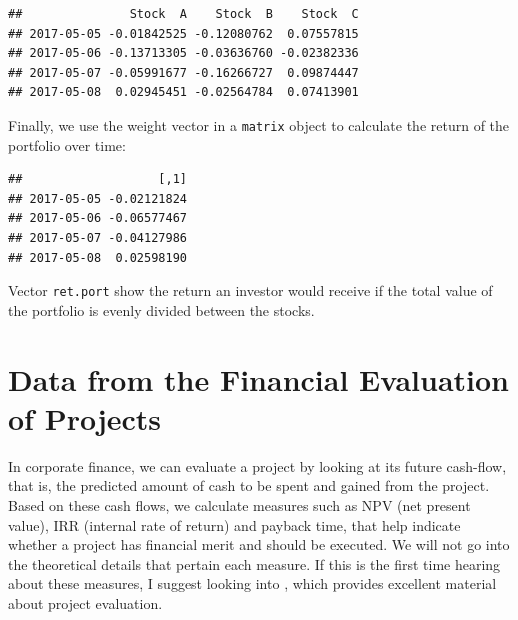 \documentclass[11pt,]{book}
\newenvironment{Shaded}{\begin{snugshade}}{\end{snugshade}}
\newcommand{\KeywordTok}[1]{\textcolor[rgb]{0.27,0.27,0.27}{\textbf{#1}}}
\newcommand{\DataTypeTok}[1]{\textcolor[rgb]{0.27,0.27,0.27}{#1}}
\newcommand{\DecValTok}[1]{\textcolor[rgb]{0.06,0.06,0.06}{#1}}
\newcommand{\StringTok}[1]{\textcolor[rgb]{0.5,0.5,0.5}{#1}}
\newcommand{\CommentTok}[1]{\textcolor[rgb]{0.56,0.35,0.01}{\textit{#1}}}
\newcommand{\OperatorTok}[1]{\textcolor[rgb]{0.81,0.36,0.00}{\textbf{#1}}}
\newcommand{\NormalTok}[1]{#1}
\begin{document}
\begin{verbatim}
##               Stock  A    Stock  B    Stock  C
## 2017-05-05 -0.01842525 -0.12080762  0.07557815
## 2017-05-06 -0.13713305 -0.03636760 -0.02382336
## 2017-05-07 -0.05991677 -0.16266727  0.09874447
## 2017-05-08  0.02945451 -0.02564784  0.07413901
\end{verbatim}

Finally, we use the weight vector in a \texttt{matrix} object to
calculate the return of the portfolio over time:

\begin{Shaded}
\end{Shaded}

\begin{verbatim}
##                   [,1]
## 2017-05-05 -0.02121824
## 2017-05-06 -0.06577467
## 2017-05-07 -0.04127986
## 2017-05-08  0.02598190
\end{verbatim}

Vector \texttt{ret.port} show the return an investor would receive if
the total value of the portfolio is evenly divided between the stocks.

\section{Data from the Financial Evaluation of
Projects}\label{data-from-the-financial-evaluation-of-projects}

In corporate finance, we can evaluate a project by looking at its future
cash-flow, that is, the predicted amount of cash to be spent and gained
from the project. Based on these cash flows, we calculate measures such
as NPV (net present value), IRR (internal rate of return) and payback
time, that help indicate whether a project has financial merit and
should be executed. We will not go into the theoretical details that
pertain each measure. If this is the first time hearing about these
measures, I suggest looking into \citet{ross2008fundamentals}, which
provides excellent material about project evaluation.
\end{document}
